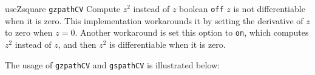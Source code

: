
\begin{cvcoptions}

\item %
  \keydef
    {useZsquare}{%
    \texttt{gzpathCV}}{%
    Compute $z^2$ instead of $z$}{%
    boolean}{%
    \texttt{off}}{%
    $z$ is not differentiable when it is zero. This implementation workarounds it by setting the derivative of $z$ to zero when $z = 0$. Another workaround is set this option to \texttt{on}, which computes $z^2$ instead of $z$, and then $z^2$ is differentiable when it is zero.
  }

\end{cvcoptions}

The usage of \texttt{gzpathCV} and \texttt{gspathCV} is illustrated below:

